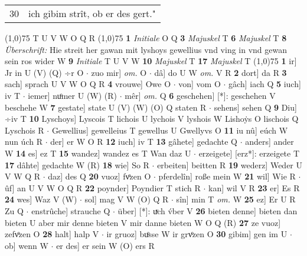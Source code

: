 \documentclass[8pt,a4paper,notitlepage]{article}
\begin{document}
\begin{table}[ht]
\begin{minipage}[t]{0.5\linewidth}
\begin{tabular}{rl}
30 & ich gibim strît, ob er des gert."\\ 
\end{tabular}
\scriptsize
\line(1,0){75} \newline
T U V W O Q R \newline
\line(1,0){75} \newline
\textbf{1} \textit{Initiale} O Q  \textbf{3} \textit{Majuskel} T  \textbf{6} \textit{Majuskel} T  \textbf{8} \textit{Überschrift:} Hie streit her gawan mit lyshoys gewellius vnd ving in vnd gewan sein ros wider W  \textbf{9} \textit{Initiale} T U V W  \textbf{10} \textit{Majuskel} T  \textbf{17} \textit{Majuskel} T  \newline
\line(1,0){75} \newline
\textbf{1} ir] Jr in U (V) (Q) ÷r O  $\cdot$ zuo mir] \textit{om.} O  $\cdot$ dâ] do U W \textit{om.} V R \textbf{2} dort] da R \textbf{3} sach] sprach U V W O Q R \textbf{4} vrouwe] Owe O  $\cdot$ von] vom O  $\cdot$ gâch] iach Q \textbf{5} iuch] iv T  $\cdot$ iemer] nuͦmer U (W) (R)  $\cdot$ mêr] \textit{om.} Q \textbf{6} geschehen] [*]: geschehen V beschehe W \textbf{7} gestate] state U (V) (W) (O) Q staten R  $\cdot$ sehens] sehen Q \textbf{9} Diu] ÷iv T \textbf{10} Lyschoys] Lyscois T lichois U lychois V lyshois W Lishoẏs O lischois Q Lyschois R  $\cdot$ Gewellius] gewelleius T gewellus U Gwellyvs O \textbf{11} iu nû] eúch W nun úch R  $\cdot$ der] er W O R \textbf{12} iuch] iv T \textbf{13} gâhete] gedachte Q  $\cdot$ anders] ander W \textbf{14} es] ez T \textbf{15} wandez] wandez es T Wan daz U  $\cdot$ erzeigete] [erz*]: erzeigete T \textbf{17} dâhte] gedachte W (R) \textbf{18} wie] So R  $\cdot$ erbeiten] beitten R \textbf{19} wederz] Weder U V W Q R  $\cdot$ daz] des Q \textbf{20} vuoz] fvͦzen O  $\cdot$ pferdelîn] roße mein W \textbf{21} wil] Wie R  $\cdot$ ûf] an U V W O Q R \textbf{22} poynder] Poyndier T stich R  $\cdot$ kan] wil V R \textbf{23} er] Es R \textbf{24} wes] Waz V (W)  $\cdot$ sol] mag V W (O) Q R  $\cdot$ sîn] min T \textit{om.} W \textbf{25} ez] Er U R Zu Q  $\cdot$ enstrûche] strauche Q  $\cdot$ über] [*]: uͮch v́ber V \textbf{26} bieten denne] bieten dan bieten U aber mir denne bieten V mir danne bieten W O Q (R) \textbf{27} ze vuoz] zefvͦzen O \textbf{28} halt] halp V  $\cdot$ ir gruoz] buͦsse W ir grvͦzen O \textbf{30} gibim] gen im U  $\cdot$ ob] wenn W  $\cdot$ er des] er sein W (O) ers R \newline
\end{minipage}
\end{table}
\end{document}
